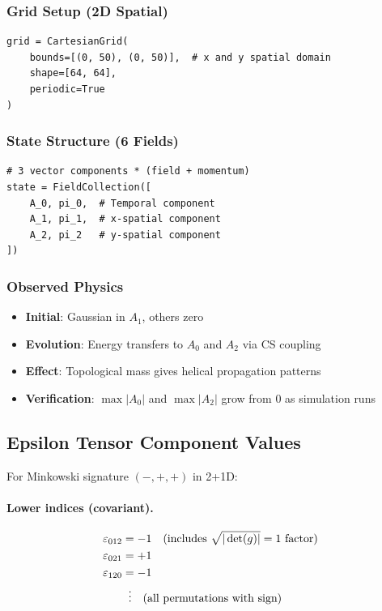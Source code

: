 \subsubsection{Grid Setup (2D Spatial)}
\label{sec:cs-grid}

\begin{lstlisting}[style=python]
grid = CartesianGrid(
    bounds=[(0, 50), (0, 50)],  # x and y spatial domain
    shape=[64, 64],
    periodic=True
)
\end{lstlisting}

\subsubsection{State Structure (6 Fields)}
\label{sec:cs-state}

\begin{lstlisting}[style=python]
# 3 vector components * (field + momentum)
state = FieldCollection([
    A_0, pi_0,  # Temporal component
    A_1, pi_1,  # x-spatial component
    A_2, pi_2   # y-spatial component
])
\end{lstlisting}

\subsubsection{Observed Physics}
\label{sec:cs-observed-physics}

\begin{itemize}
  \item \textbf{Initial}: Gaussian in $A_1$, others zero
  \item \textbf{Evolution}: Energy transfers to $A_0$ and $A_2$ via CS coupling
  \item \textbf{Effect}: Topological mass gives helical propagation patterns
  \item \textbf{Verification}: $\max|A_0|$ and $\max|A_2|$ grow from 0 as simulation runs
\end{itemize}

\subsection{Epsilon Tensor Component Values}
\label{sec:cs-epsilon}

For Minkowski signature $(-,+,+)$ in 2+1D:

\paragraph{Lower indices (covariant).}
\label{par:cs-lower-epsilon}
\begin{align}
  \varepsilon_{012} &= -1 \quad\text{(includes $\sqrt{|\det(g)|} = 1$ factor)} \notag \\
  \varepsilon_{021} &= +1 \notag \\
  \varepsilon_{120} &= -1 \notag \\
  &\;\;\vdots \quad\text{(all permutations with sign)} \notag
\end{align}

